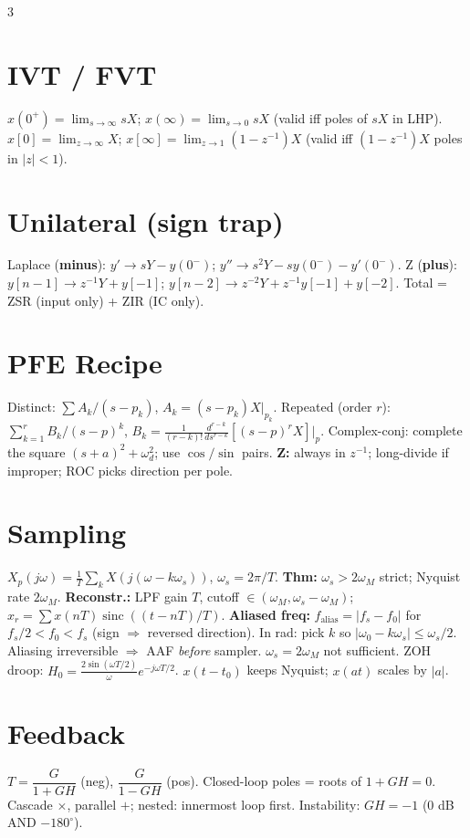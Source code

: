 \documentclass[9pt,landscape]{extarticle}
\DeclareMathOperator{\sinc}{sinc}
\begin{document}
\begin{multicols*}{3}
\section*{IVT / FVT}
$x(0^+)\!=\!\lim_{s\to\infty}sX$; $x(\infty)\!=\!\lim_{s\to 0}sX$ (valid iff poles of $sX$ in LHP).
$x[0]\!=\!\lim_{z\to\infty}X$; $x[\infty]\!=\!\lim_{z\to 1}(1{-}z^{-1})X$ (valid iff $(1{-}z^{-1})X$ poles in $|z|<1$).

\section*{Unilateral (sign trap)}
Laplace (\textbf{minus}): $y'\!\to\!sY-y(0^-)$; $y''\!\to\!s^2Y-sy(0^-)-y'(0^-)$.
Z (\textbf{plus}): $y[n{-}1]\!\to\!z^{-1}Y+y[-1]$; $y[n{-}2]\!\to\!z^{-2}Y+z^{-1}y[-1]+y[-2]$.
Total = ZSR (input only) + ZIR (IC only).

\section*{PFE Recipe}
Distinct: $\sum A_k/(s{-}p_k)$, $A_k=(s{-}p_k)X|_{p_k}$.
Repeated (order $r$): $\sum_{k=1}^{r}B_k/(s{-}p)^k$, $B_k=\tfrac{1}{(r-k)!}\tfrac{d^{r-k}}{ds^{r-k}}[(s{-}p)^r X]|_{p}$.
Complex-conj: complete the square $(s+a)^2+\omega_d^2$; use $\cos/\sin$ pairs.
\textbf{Z:} always in $z^{-1}$; long-divide if improper; ROC picks direction per pole.

\section*{Sampling}
$X_p(j\omega)=\tfrac{1}{T}\sum_k X(j(\omega{-}k\omega_s))$, $\omega_s=2\pi/T$.
\textbf{Thm:} $\omega_s>2\omega_M$ strict; Nyquist rate $2\omega_M$.
\textbf{Reconstr.:} LPF gain $T$, cutoff $\in(\omega_M,\omega_s{-}\omega_M)$; $x_r=\sum x(nT)\sinc((t{-}nT)/T)$.
\textbf{Aliased freq:} $f_{\text{alias}}=|f_s-f_0|$ for $f_s/2<f_0<f_s$ (sign $\Rightarrow$ reversed direction). In rad: pick $k$ so $|\omega_0-k\omega_s|\le\omega_s/2$.
Aliasing irreversible $\Rightarrow$ AAF \emph{before} sampler. $\omega_s=2\omega_M$ not sufficient. ZOH droop: $H_0=\tfrac{2\sin(\omega T/2)}{\omega}e^{-j\omega T/2}$. $x(t{-}t_0)$ keeps Nyquist; $x(at)$ scales by $|a|$.

\section*{Feedback}
$T=\dfrac{G}{1+GH}$ (neg), $\dfrac{G}{1-GH}$ (pos). Closed-loop poles = roots of $1+GH=0$.
Cascade $\times$, parallel $+$; nested: innermost loop first.
Instability: $GH=-1$ (0 dB AND $-180^\circ$).


\end{multicols*}
\end{document}
